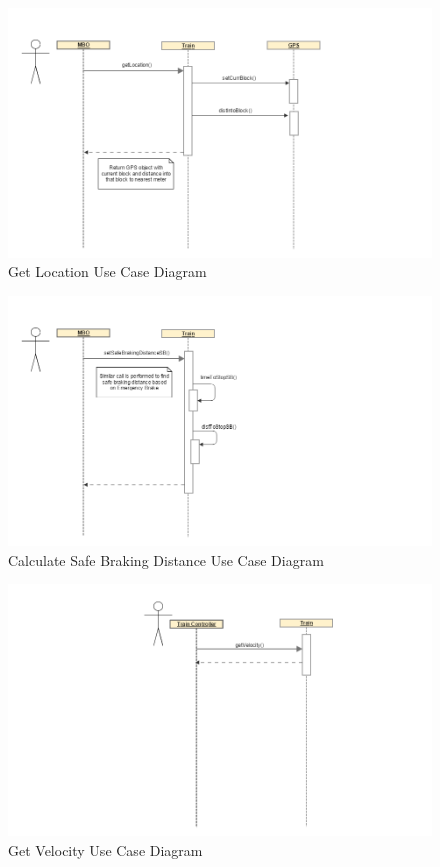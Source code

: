 \documentclass[]{article}
\begin{document}
\begin{figure}[H]
	\centering
	\includegraphics[scale=.3]{train_model_sqd_get_location.png}
	\caption{Get Location Use Case Diagram}
\end{figure}

\begin{figure}[H]
	\centering
	\includegraphics[scale=.5]{train_model_sqd_get_safebraking_dist.png}
	\caption{Calculate Safe Braking Distance Use Case Diagram}
\end{figure}

\begin{figure}[H]
	\centering
	\includegraphics[scale=.5]{train_model_sqd_get_velocity.png}
	\caption{Get Velocity Use Case Diagram}
\end{figure}
\end{document}
